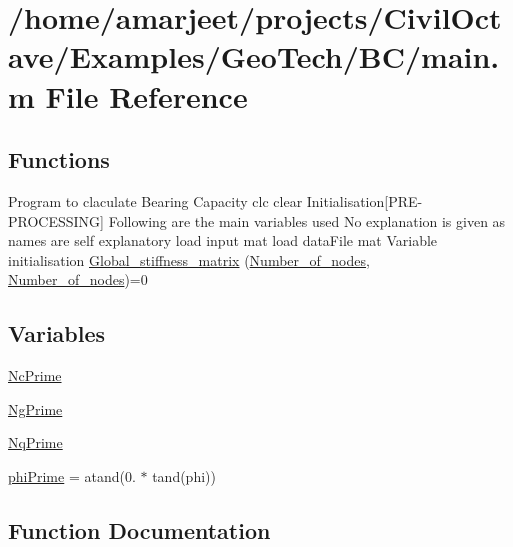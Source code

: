\hypertarget{a00006}{}\section{/home/amarjeet/projects/\+Civil\+Octave/\+Examples/\+Geo\+Tech/\+B\+C/main.m File Reference}
\label{a00006}
\subsection*{Functions}
\begin{DoxyCompactItemize}
\item 
Program to claculate Bearing Capacity clc clear Initialisation\mbox{[}P\+R\+E-\/P\+R\+O\+C\+E\+S\+S\+I\+N\+G\mbox{]} Following are the main variables used No explanation is given as names are self explanatory load input mat load data\+File mat Variable initialisation \hyperlink{a00006_a31cdcce530a93925f9b8c6349e94e70b}{Global\+\_\+stiffness\+\_\+matrix} (\hyperlink{a00007_a1d65c23ed4744bf98747671b08490b5c}{Number\+\_\+of\+\_\+nodes}, \hyperlink{a00007_a1d65c23ed4744bf98747671b08490b5c}{Number\+\_\+of\+\_\+nodes})=0
\end{DoxyCompactItemize}
\subsection*{Variables}
\begin{DoxyCompactItemize}
\item 
\hyperlink{a00006_aae2972ba47d756535fc8fa0206dd7d53}{Nc\+Prime}
\item 
\hyperlink{a00006_a1cbfb427d0fd236ae4446fb44e5b64d1}{Ng\+Prime}
\item 
\hyperlink{a00006_ade3072591b86caf4be69b3a9c353f213}{Nq\+Prime}
\item 
\hyperlink{a00006_a430c21324a0c2608090a5bb4e98d093c}{phi\+Prime} = atand(0. $\ast$ tand(phi))
\end{DoxyCompactItemize}


\subsection{Function Documentation}
\hypertarget{a00006_a31cdcce530a93925f9b8c6349e94e70b}{}
